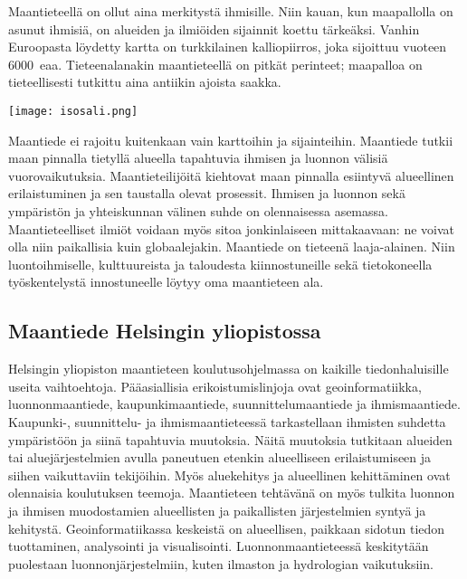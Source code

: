\documentclass[../ala_hataile.tex]{subfiles}
\begin{document}
	\clearpage
		
Maantieteellä on ollut aina merkitystä
ihmisille. Niin kauan, kun maapallolla
on asunut ihmisiä, on alueiden
ja ilmiöiden sijainnit koettu tärkeäksi.
Vanhin Euroopasta löydetty kartta
on turkkilainen kalliopiirros, joka sijoittuu
vuoteen 6000~eaa. Tieteenalanakin
maantieteellä on pitkät perinteet; maapalloa
on tieteellisesti tutkittu aina antiikin
ajoista saakka.

\begin{figure*}[!b]
	\texttt{[image: isosali.png]}
\end{figure*}

Maantiede ei rajoitu kuitenkaan vain
karttoihin ja sijainteihin. Maantiede
tutkii maan pinnalla tietyllä alueella
tapahtuvia ihmisen ja luonnon välisiä
vuorovaikutuksia. Maantieteilijöitä
kiehtovat maan pinnalla esiintyvä alueellinen
erilaistuminen ja sen taustalla
olevat prosessit. Ihmisen ja luonnon
sekä ympäristön ja yhteiskunnan välinen
suhde on olennaisessa asemassa.
Maantieteelliset ilmiöt voidaan myös
sitoa jonkinlaiseen mittakaavaan: ne
voivat olla niin paikallisia kuin globaalejakin.
Maantiede on tieteenä laaja-alainen.
Niin luontoihmiselle, kulttuureista
ja taloudesta kiinnostuneille sekä
tietokoneella työskentelystä innostuneelle
löytyy oma maantieteen ala.

\subsection*{Maantiede Helsingin yliopistossa}
Helsingin yliopiston maantieteen koulutusohjelmassa on
kaikille tiedonhaluisille useita vaihtoehtoja. 
Pääasiallisia erikoistumislinjoja ovat geoinformatiikka, 
luonnonmaantiede, kaupunkimaantiede, 
suunnittelumaantiede ja ihmismaantiede. 
Kaupunki-, suunnittelu- ja ihmismaantieteessä 
tarkastellaan ihmisten suhdetta
ympäristöön ja siinä tapahtuvia muutoksia.
Näitä muutoksia tutkitaan alueiden
tai aluejärjestelmien avulla paneutuen etenkin
alueelliseen erilaistumiseen ja siihen vaikuttaviin tekijöihin.
Myös aluekehitys ja alueellinen kehittäminen ovat  
olennaisia koulutuksen teemoja.
Maantieteen tehtävänä on myös tulkita 
luonnon ja ihmisen muodostamien
alueellisten ja paikallisten järjestelmien
syntyä ja kehitystä. Geoinformatiikassa
keskeistä on alueellisen,
paikkaan sidotun tiedon tuottaminen,
analysointi ja visualisointi. Luonnonmaantieteessä
keskitytään puolestaan luonnonjärjestelmiin, 
kuten ilmaston ja hydrologian vaikutuksiin.
\end{document}
